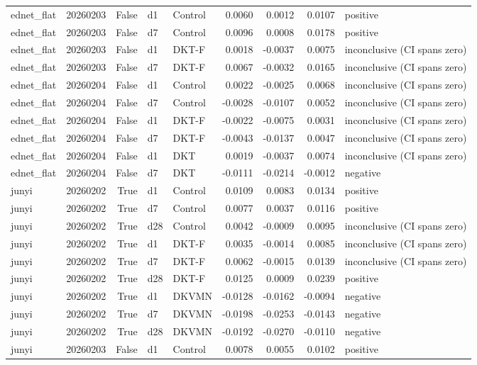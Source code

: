 \begin{tabular}{lrrllrrrl}
ednet\_flat & 20260203 & False & d1 & Control & 0.0060 & 0.0012 & 0.0107 & positive \\
ednet\_flat & 20260203 & False & d7 & Control & 0.0096 & 0.0008 & 0.0178 & positive \\
ednet\_flat & 20260203 & False & d1 & DKT-F & 0.0018 & -0.0037 & 0.0075 & inconclusive (CI spans zero) \\
ednet\_flat & 20260203 & False & d7 & DKT-F & 0.0067 & -0.0032 & 0.0165 & inconclusive (CI spans zero) \\
ednet\_flat & 20260204 & False & d1 & Control & 0.0022 & -0.0025 & 0.0068 & inconclusive (CI spans zero) \\
ednet\_flat & 20260204 & False & d7 & Control & -0.0028 & -0.0107 & 0.0052 & inconclusive (CI spans zero) \\
ednet\_flat & 20260204 & False & d1 & DKT-F & -0.0022 & -0.0075 & 0.0031 & inconclusive (CI spans zero) \\
ednet\_flat & 20260204 & False & d7 & DKT-F & -0.0043 & -0.0137 & 0.0047 & inconclusive (CI spans zero) \\
ednet\_flat & 20260204 & False & d1 & DKT & 0.0019 & -0.0037 & 0.0074 & inconclusive (CI spans zero) \\
ednet\_flat & 20260204 & False & d7 & DKT & -0.0111 & -0.0214 & -0.0012 & negative \\
junyi & 20260202 & True & d1 & Control & 0.0109 & 0.0083 & 0.0134 & positive \\
junyi & 20260202 & True & d7 & Control & 0.0077 & 0.0037 & 0.0116 & positive \\
junyi & 20260202 & True & d28 & Control & 0.0042 & -0.0009 & 0.0095 & inconclusive (CI spans zero) \\
junyi & 20260202 & True & d1 & DKT-F & 0.0035 & -0.0014 & 0.0085 & inconclusive (CI spans zero) \\
junyi & 20260202 & True & d7 & DKT-F & 0.0062 & -0.0015 & 0.0139 & inconclusive (CI spans zero) \\
junyi & 20260202 & True & d28 & DKT-F & 0.0125 & 0.0009 & 0.0239 & positive \\
junyi & 20260202 & True & d1 & DKVMN & -0.0128 & -0.0162 & -0.0094 & negative \\
junyi & 20260202 & True & d7 & DKVMN & -0.0198 & -0.0253 & -0.0143 & negative \\
junyi & 20260202 & True & d28 & DKVMN & -0.0192 & -0.0270 & -0.0110 & negative \\
junyi & 20260203 & False & d1 & Control & 0.0078 & 0.0055 & 0.0102 & positive \\

\end{tabular}
